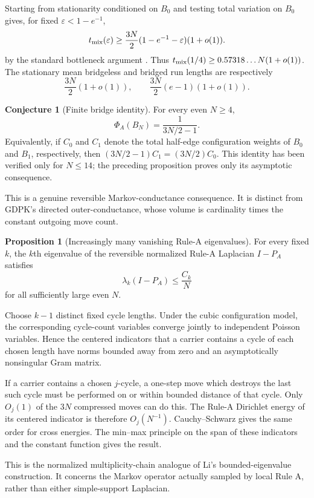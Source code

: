 \documentclass[11pt]{article}
\makeatletter
\theoremstyle{definition}
\newtheorem{proposition}[theorem]{Proposition}
\newtheorem{conjecture}[theorem]{Conjecture}
\renewenvironment{proof}[1][\proofname]{\par
  \pushQED{\qed}%
  \normalfont \topsep6\p@\@plus6\p@\relax
  \trivlist
  \item[\hskip\labelsep\bfseries #1\@addpunct{.}]\ignorespaces
}{%
  \popQED\endtrivlist\@endpefalse
}
\makeatother
\begin{document}
Starting from stationarity conditioned on $B_0$ and testing total variation on
$B_0$ gives, for fixed $\varepsilon<1-e^{-1}$,
\[
 t_{\rm mix}(\varepsilon)
 \ge \frac{3N}{2}(1-e^{-1}-\varepsilon)(1+o(1)).
\]
by the standard bottleneck argument \cite{levin-peres-wilmer}.
Thus $t_{\rm mix}(1/4)\ge0.57318\ldots N(1+o(1))$.  The stationary mean
bridgeless and bridged run lengths are respectively
\[
 \frac{3N}{2}(1+o(1)),\qquad
 \frac{3N}{2}(e-1)(1+o(1)).
\]
\begin{conjecture}[Finite bridge identity]
For every even $N\ge4$,
\[
 \Phi_A(B_N)=\frac1{3N/2-1}.
\]
Equivalently, if $C_0$ and $C_1$ denote the total half-edge configuration
weights of $B_0$ and $B_1$, respectively, then
$(3N/2-1)C_1=(3N/2)C_0$.  This identity has been verified only for
$N\le14$; the preceding proposition proves only its asymptotic consequence.
\end{conjecture}

This is a genuine reversible Markov-conductance consequence.  It is distinct
from GDPK's directed outer-conductance, whose volume is cardinality times the
constant outgoing move count.

\begin{proposition}[Increasingly many vanishing Rule-A eigenvalues]
For every fixed $k$, the $k$th eigenvalue of the reversible normalized
Rule-A Laplacian $I-P_A$ satisfies
\[
    \lambda_k(I-P_A)\le \frac{C_k}{N}
\]
for all sufficiently large even $N$.
\end{proposition}

\begin{proof}
Choose $k-1$ distinct fixed cycle lengths.  Under the cubic configuration
model, the corresponding cycle-count variables converge jointly to
independent Poisson variables.  Hence the centered indicators that a carrier
contains a cycle of each chosen length have norms bounded away from zero and
an asymptotically nonsingular Gram matrix.

If a carrier contains a chosen $j$-cycle, a one-step move which destroys the
last such cycle must be performed on or within bounded distance of that cycle.
Only $O_j(1)$ of the $3N$ compressed moves can do this.  The Rule-A Dirichlet
energy of its centered indicator is therefore $O_j(N^{-1})$.  Cauchy--Schwarz
gives the same order for cross energies.  The min--max principle on the span of
these indicators and the constant function gives the result.
\end{proof}

This is the normalized multiplicity-chain analogue of Li's bounded-eigenvalue
construction.  It concerns the Markov operator actually sampled by local
Rule A, rather than either simple-support Laplacian.
\end{document}
